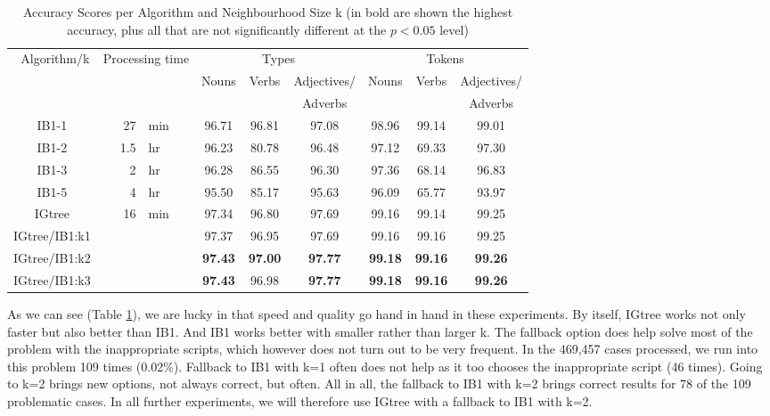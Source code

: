 \documentclass[a4paper,10pt,twoside]{article}
\begin{document}
\begin{table}[tbh]
\begin{center}
\centering
\begin{tabular}{|c|r@{ }l|ccc|ccc|}
\hline
 Algorithm/k & \multicolumn{2}{|c|}{Processing time} & \multicolumn{3}{|c|}{Types} & \multicolumn{3}{|c|}{Tokens} \\
 & & & Nouns & Verbs & Adjectives/ & Nouns & Verbs & Adjectives/ \\ 
  & & &  &  & Adverbs &  &  & Adverbs \\ 
\hline

\hline

IB1-1 & 27 & min & 96.71 & 96.81 & 97.08 & 98.96 & 99.14 & 99.01 \\

IB1-2 & \hspace{1.5em}1.5 & hr & 96.23 & 80.78 & 96.48 & 97.12 & 69.33 & 97.30 \\

IB1-3 & 2 & hr & 96.28 & 86.55 & 96.30 & 97.36 & 68.14 & 96.83 \\

IB1-5 & 4 & hr & 95.50 & 85.17 & 95.63 & 96.09 & 65.77 & 93.97 \\

IGtree & 16 & min & 97.34 & 96.80 & 97.69 & 99.16 & 99.14 & 99.25 \\

IGtree/IB1:k1 & & & 97.37 & 96.95 & 97.69 & 99.16 & 99.16 & 99.25 \\

IGtree/IB1:k2 & & & \textbf{97.43} & \textbf{97.00} & \textbf{97.77} & \textbf{99.18} & \textbf{99.16} & \textbf{99.26} \\

IGtree/IB1:k3 & & & \textbf{97.43} & 96.98 & \textbf{97.77} & \textbf{99.18} & \textbf{99.16} & \textbf{99.26} \\


\hline
\end{tabular}
\caption{Accuracy Scores per Algorithm and Neighbourhood Size k (in bold are shown the highest accuracy, plus all that are not significantly different at the $p<0.05$ level)}
\label{tab_results_alg}
\end{center}
\end{table}


As we can see (Table \ref{tab_results_alg}), we are lucky in that speed and quality go hand in hand in these experiments. By itself, IGtree works not only faster but also better than IB1. And IB1 works better with smaller rather than larger k. The fallback option does help solve most of the problem with the inappropriate scripts, which however does not turn out to be very frequent. In the 469,457 cases processed, we run into this problem 109 times (0.02\%). Fallback to IB1 with k=1 often does not help as it too chooses the inappropriate script (46 times). Going to k=2 brings new options, not always correct, but often. All in all, the fallback to IB1 with k=2 brings correct results for 78 of the 109 problematic cases. In all further experiments, we will therefore use IGtree with a fallback to IB1 with k=2.
\end{document}
